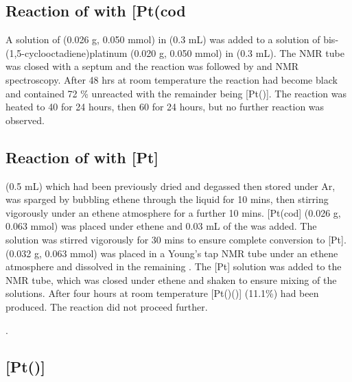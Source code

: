 \subsection*{Reaction of \tButhixantphos{} with \texorpdfstring{[Pt(cod\ce{)2]}} P}

A solution of \tButhixantphos{} (0.026 g, 0.050 mmol) in  (0.3 mL) was added to a solution of bis-(1,5-cyclooctadiene)platinum (0.020 g, 0.050 mmol) in  (0.3 mL).  The NMR tube was closed with a septum and the reaction was followed by \proton{} and \phosphorus{} NMR spectroscopy.  After 48 hrs at room temperature the reaction had become black and contained 72 \% unreacted \tButhixantphos{} with the remainder being [Pt(\tButhixantphos)].  The reaction was heated to 40 \degC{} for 24 hours, then 60 \degC{} for 24 hours, but no further reaction was observed.  

\subsection*{Reaction of \tBusixantphos{} with \texorpdfstring{[Pt]} P}

 (0.5 mL) which had been previously dried and degassed then stored under Ar, was sparged by bubbling ethene through the liquid for 10 mins, then stirring vigorously under an ethene atmosphere for a further 10 mins.  [Pt(cod] (0.026 g, 0.063 mmol) was placed under ethene and 0.03 mL of the  was added.  The solution was stirred vigorously for 30 mins to ensure complete conversion to [Pt].  \tBuSixantphos(0.032 g, 0.063 mmol) was placed in a Young's tap NMR tube under an ethene atmosphere and dissolved in the remaining .  The [Pt] solution was added to the NMR tube, which was closed under ethene and shaken to ensure mixing of the solutions.  After four hours at room temperature [Pt(\tBusixantphos)()] (11.1\%) had been produced.  The reaction did not proceed further.

.

\subsection*{\texorpdfstring{[Pt(\tButhixantphos)]} P}


